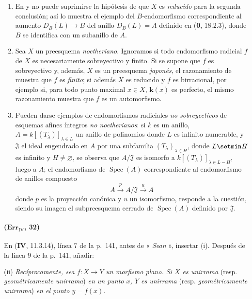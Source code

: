 \begin{remarks}[10.4.14]
\label{IV.10.4.14}
\begin{enumerate}[label=\textup{(\roman*)}]
\item En {} y
{} no puede suprimirse
la hipótesis de que $X$ es \emph{reducido} para la segunda conclusión; así lo
muestra el ejemplo del $B$-endomorfismo correspondiente al aumento
$D_B(L)\to B$ del anillo $D_B(L)=A$ definido en (\textbf{0}, 18.2.3), donde
$B$ se identifica con un subanillo de $A$.

\item Sea $X$ un preesquema \emph{noetheriano}. Ignoramos si todo endomorfismo radicial $f$ de $X$ es necesariamente sobreyectivo y finito.
Si se supone que $f$ es sobreyectivo y, además, $X$ es un preesquema
\emph{japonés}, el razonamiento de
{} muestra que $f$ es \emph{finito};
si además $X$ es reducido y $f$ es birracional, por ejemplo si,
para todo punto maximal $x\in X$, $\boldsymbol{k}(x)$ es perfecto, el mismo
razonamiento muestra que $f$ es un automorfismo.

\item Pueden darse ejemplos de endomorfismos radiciales \emph{no
sobreyectivos} de esquemas afines íntegros \emph{no noetherianos}: si $k$ es un
anillo, $A=k[(T_\lambda)]_{\lambda\in L}$ un anillo de polinomios donde $L$
es infinito numerable, y $\mathfrak J$ el ideal engendrado en $A$ por
una subfamilia $(T_\lambda)_{\lambda\in H}$, donde $L\setmin H$ es infinito y
$H\neq\varnothing$, se observa que $A/\mathfrak J$ es isomorfo a
$k[(T_\lambda)]_{\lambda\in L-H}$, luego a $A$; el endomorfismo de
$\operatorname{Spec}(A)$ correspondiente al endomorfismo de anillos
compuesto
\[
 A\xrightarrow{p}A/\mathfrak J\xrightarrow{u}A
\]
donde $p$ es la proyección canónica y $u$ un isomorfismo, responde a la
cuestión, siendo su imagen el subpreesquema cerrado de
$\operatorname{Spec}(A)$ definido por $\mathfrak J$.
\end{enumerate}
\end{remarks}

\paragraph{($\mathbf{Err}_{\mathrm{IV}}$, 32)}
En (\textbf{IV}, 11.3.14), línea 7 de la p.~141, antes de « \emph{Sean} », insertar
(i). Después de la línea 9 de la p.~141, añadir:

\smallskip
\noindent
\textup{(ii)} \emph{Recíprocamente, sea $f:X\to Y$ un morfismo plano. Si $X$
es unirrama} (resp. \emph{geométricamente unirrama}) \emph{en un punto $x$, $Y$
es unirrama} (resp. \emph{geométricamente unirrama}) \emph{en el punto $y=f(x)$.}

